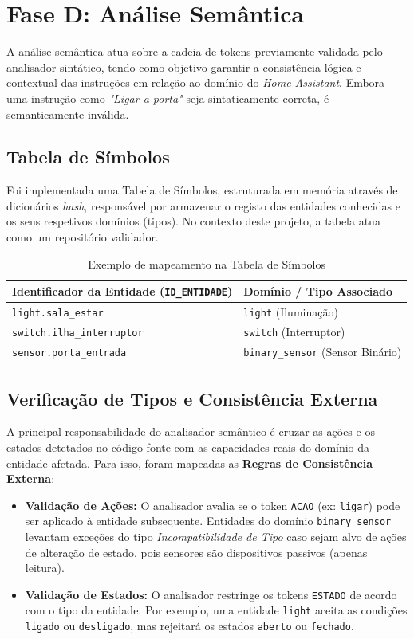 \documentclass[12pt, a4paper]{article}
\begin{document}
\section{Fase D: Análise Semântica}
A análise semântica atua sobre a cadeia de tokens previamente validada pelo analisador sintático, tendo como objetivo garantir a consistência lógica e contextual das instruções em relação ao domínio do \textit{Home Assistant}. Embora uma instrução como \textit{"Ligar a porta"} seja sintaticamente correta, é semanticamente inválida.

\subsection{Tabela de Símbolos}
Foi implementada uma Tabela de Símbolos, estruturada em memória através de dicionários \textit{hash}, responsável por armazenar o registo das entidades conhecidas e os seus respetivos domínios (tipos). No contexto deste projeto, a tabela atua como um repositório validador.

\begin{table}[H]
\centering
\begin{tabular}{@{}ll@{}}
\toprule
\textbf{Identificador da Entidade (\texttt{ID\_ENTIDADE})} & \textbf{Domínio / Tipo Associado} \\ \midrule
\texttt{light.sala\_estar} & \texttt{light} (Iluminação) \\
\texttt{switch.ilha\_interruptor} & \texttt{switch} (Interruptor) \\
\texttt{sensor.porta\_entrada} & \texttt{binary\_sensor} (Sensor Binário) \\ \bottomrule
\end{tabular}
\caption{Exemplo de mapeamento na Tabela de Símbolos}
\label{tab:tabela_simbolos}
\end{table}

\subsection{Verificação de Tipos e Consistência Externa}
A principal responsabilidade do analisador semântico é cruzar as ações e os estados detetados no código fonte com as capacidades reais do domínio da entidade afetada. Para isso, foram mapeadas as \textbf{Regras de Consistência Externa}:

\begin{itemize}
    \item \textbf{Validação de Ações:} O analisador avalia se o token \texttt{ACAO} (ex: \texttt{ligar}) pode ser aplicado à entidade subsequente. Entidades do domínio \texttt{binary\_sensor} levantam exceções do tipo \textit{Incompatibilidade de Tipo} caso sejam alvo de ações de alteração de estado, pois sensores são dispositivos passivos (apenas leitura).
    \item \textbf{Validação de Estados:} O analisador restringe os tokens \texttt{ESTADO} de acordo com o tipo da entidade. Por exemplo, uma entidade \texttt{light} aceita as condições \texttt{ligado} ou \texttt{desligado}, mas rejeitará os estados \texttt{aberto} ou \texttt{fechado}.
\end{itemize}
\end{document}
